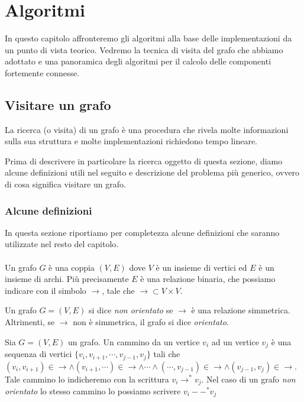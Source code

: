 \chapter{Algoritmi}
\label{chapter:theoretical-background}
In questo capitolo affronteremo gli algoritmi alla base delle
implementazioni da un punto di vista teorico. Vedremo la tecnica di
visita del grafo che abbiamo adottato e una panoramica degli algoritmi
per il calcolo delle componenti fortemente connesse.

\section{Visitare un grafo}

La ricerca (o visita) di un grafo \`e una procedura che rivela molte
informazioni sulla sua struttura e molte implementazioni richiedono
tempo lineare.

Prima di descrivere in particolare la ricerca oggetto di questa
sezione, diamo alcune definizioni utili nel seguito e descrizione del
problema pi\`u generico, ovvero di cosa significa visitare un grafo.

\subsection{Alcune definizioni}
\label{subsection:some-definitions}
In questa sezione riportiamo per completezza alcune definizioni che
saranno utilizzate nel resto del capitolo.
\\\\
Un grafo $G$ \`e una coppia $(V, E)$ dove $V$ \`e un insieme di
vertici ed $E$ \`e un insieme di archi. Pi\`u precisamente $E$ \`e una
relazione binaria, che possiamo indicare con il simbolo $\rightarrow$,
tale che $\rightarrow \subset V \times V$. 

Un grafo $G = (V, E)$ si dice \emph{non orientato} se $\rightarrow$
\`e una relazione simmetrica. Altrimenti, se $\rightarrow$ non \`e
simmetrica, il grafo si dice \emph{orientato}.

Sia $G = (V, E)$ un grafo. Un cammino da un vertice $v_{i}$ ad un
vertice $v_{j}$ \`e una sequenza di vertici $\{v_{i}, v_{i+1}, \cdots,
v_{j-1}, v_{j}\}$ tali che $(v_{i},v_{i+1}) \in \rightarrow \wedge
(v_{i+1}, \cdots) \in \rightarrow \wedge \cdots \wedge (\cdots,
v_{j-1}) \in \rightarrow \wedge (v_{j-1}, v_{j}) \in
\rightarrow$. Tale cammino lo indicheremo con la scrittura $v_{i}
\rightarrow^{*} v_{j}$. Nel caso di un grafo \emph{non orientato} lo
stesso cammino lo possiamo scrivere $v_{i} --^{*} v_{j}$


